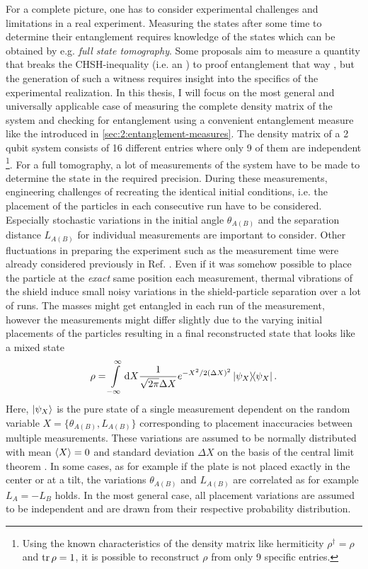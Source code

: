 For a complete picture, one has to consider experimental challenges and limitations in a real experiment. 
Measuring the states after some time to determine their entanglement requires knowledge of the states which can be obtained by e.g. \emph{full state tomography}.
Some proposals aim to measure a quantity that breaks the CHSH-inequality \cite{Clauser_1969} (i.e. an ) to proof entanglement that way \cite{Bose_2017,Chevalier_2020}, but the generation of such a witness requires insight into the specifics of the experimental realization.
In this thesis, I will focus on the most general and universally applicable case of measuring the complete density matrix of the system and checking for entanglement using a convenient entanglement measure like the  \cite{Plenio_2005} introduced in \cref{sec:2:entanglement-measures}.
The density matrix of a 2 qubit system consists of 16 different entries where only 9 of them are independent \footnote{Using the known characteristics of the density matrix like hermiticity $\rho^\dagger = \rho$ and $\tr \rho = 1$, it is possible to reconstruct $\rho$ from only 9 specific entries.}.
For a full tomography, a lot of measurements of the system have to be made to determine the state in the required precision.
During these measurements, engineering challenges of recreating the identical initial conditions, i.e. the placement of the particles in each consecutive run have to be considered.
Especially stochastic variations in the initial angle $\theta_{A(B)}$ and the separation distance $L_{A(B)}$ for individual measurements are important to consider. Other fluctuations in preparing the experiment such as the measurement time were already considered previously in Ref. \cite{Nguyen_2020}.
Even if it was somehow possible to place the particle at the \textit{exact} same position each measurement, thermal vibrations of the shield induce small noisy variations in the shield-particle separation over a lot of runs.
The masses might get entangled in each run of the measurement, however the measurements might differ slightly due to the varying initial placements of the particles resulting in a final reconstructed state that looks like a mixed state
\begin{equation}
  \rho = \int\limits_{-\infty}^{\infty} \dd X \frac{1}{\sqrt{2\pi}\Delta X} e^{-X^2/2(\Delta X)^2} \ketbra{\psi_X} .
\end{equation}
Here, $\ket{\psi_X}$ is the pure state of a single measurement dependent on the random variable $X = \{\theta_{A(B)}, L_{A(B)}\}$ corresponding to placement inaccuracies between multiple measurements.
These variations are assumed to be normally distributed with mean $\left\langle X\right\rangle = 0$ and standard deviation $\Delta X$ on the basis of the central limit theorem \cite[p. 1195]{Riley_2018}.
In some cases, as for example if the plate is not placed exactly in the center or at a tilt, the variations $\theta_{A(B)}$ and $L_{A(B)}$ are correlated as for example $L_A = -L_B$ holds.
In the most general case, all placement variations are assumed to be independent and are drawn from their respective probability distribution.



